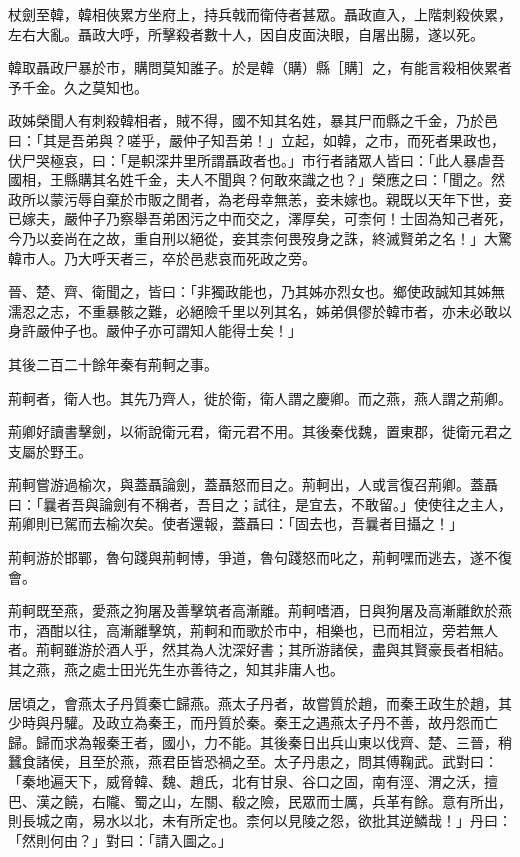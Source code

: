 \begin{pinyinscope}
杖劍至韓，韓相俠累方坐府上，持兵戟而衛侍者甚眾。聶政直入，上階刺殺俠累，左右大亂。聶政大呼，所擊殺者數十人，因自皮面決眼，自屠出腸，遂以死。

韓取聶政尸暴於市，購問莫知誰子。於是韓（購）縣［購］之，有能言殺相俠累者予千金。久之莫知也。

政姊榮聞人有刺殺韓相者，賊不得，國不知其名姓，暴其尸而縣之千金，乃於邑曰：「其是吾弟與？嗟乎，嚴仲子知吾弟！」立起，如韓，之市，而死者果政也，伏尸哭極哀，曰：「是軹深井里所謂聶政者也。」市行者諸眾人皆曰：「此人暴虐吾國相，王縣購其名姓千金，夫人不聞與？何敢來識之也？」榮應之曰：「聞之。然政所以蒙污辱自棄於市販之閒者，為老母幸無恙，妾未嫁也。親既以天年下世，妾已嫁夫，嚴仲子乃察舉吾弟困污之中而交之，澤厚矣，可柰何！士固為知己者死，今乃以妾尚在之故，重自刑以絕從，妾其柰何畏歿身之誅，終滅賢弟之名！」大驚韓市人。乃大呼天者三，卒於邑悲哀而死政之旁。

晉、楚、齊、衛聞之，皆曰：「非獨政能也，乃其姊亦烈女也。鄉使政誠知其姊無濡忍之志，不重暴骸之難，必絕險千里以列其名，姊弟俱僇於韓市者，亦未必敢以身許嚴仲子也。嚴仲子亦可謂知人能得士矣！」

其後二百二十餘年秦有荊軻之事。

荊軻者，衛人也。其先乃齊人，徙於衛，衛人謂之慶卿。而之燕，燕人謂之荊卿。

荊卿好讀書擊劍，以術說衛元君，衛元君不用。其後秦伐魏，置東郡，徙衛元君之支屬於野王。

荊軻嘗游過榆次，與蓋聶論劍，蓋聶怒而目之。荊軻出，人或言復召荊卿。蓋聶曰：「曩者吾與論劍有不稱者，吾目之；試往，是宜去，不敢留。」使使往之主人，荊卿則已駕而去榆次矣。使者還報，蓋聶曰：「固去也，吾曩者目攝之！」

荊軻游於邯鄲，魯句踐與荊軻博，爭道，魯句踐怒而叱之，荊軻嘿而逃去，遂不復會。

荊軻既至燕，愛燕之狗屠及善擊筑者高漸離。荊軻嗜酒，日與狗屠及高漸離飲於燕市，酒酣以往，高漸離擊筑，荊軻和而歌於市中，相樂也，已而相泣，旁若無人者。荊軻雖游於酒人乎，然其為人沈深好書；其所游諸侯，盡與其賢豪長者相結。其之燕，燕之處士田光先生亦善待之，知其非庸人也。

居頃之，會燕太子丹質秦亡歸燕。燕太子丹者，故嘗質於趙，而秦王政生於趙，其少時與丹驩。及政立為秦王，而丹質於秦。秦王之遇燕太子丹不善，故丹怨而亡歸。歸而求為報秦王者，國小，力不能。其後秦日出兵山東以伐齊、楚、三晉，稍蠶食諸侯，且至於燕，燕君臣皆恐禍之至。太子丹患之，問其傅鞠武。武對曰：「秦地遍天下，威脅韓、魏、趙氏，北有甘泉、谷口之固，南有涇、渭之沃，擅巴、漢之饒，右隴、蜀之山，左關、殽之險，民眾而士厲，兵革有餘。意有所出，則長城之南，易水以北，未有所定也。柰何以見陵之怨，欲批其逆鱗哉！」丹曰：「然則何由？」對曰：「請入圖之。」


\end{pinyinscope}
